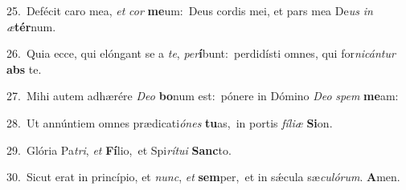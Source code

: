 {\numbfont\textcolor{\numbcolor}{25.}}~Defécit caro mea, \textit{et} \textit{cor} \textbf{me}\-um:~\star Deus cordis mei, et pars mea De\textit{us} \textit{in} \textit{æ}\-\textbf{tér}num.\par
{\numbfont\textcolor{\numbcolor}{26.}}~Quia ecce, qui elóngant se a \textit{te}\-, \textit{per}\-\textbf{í}bunt:~\star perdidísti omnes, qui for\-\textit{ni}\-\textit{cán}\textit{tur} \textbf{abs} te.\par
{\numbfont\textcolor{\numbcolor}{27.}}~Mihi autem adhærére \textit{De}\-\textit{o} \textbf{bo}\-num est:~\star pónere in Dómino \textit{De}\-\textit{o} \textit{spem} \textbf{me}\-am:\par
{\numbfont\textcolor{\numbcolor}{28.}}~Ut annúntiem omnes prædicati\-\textit{ó}\-\textit{nes} \textbf{tu}\-as,~\star in portis \textit{fí}\-\textit{li}\textit{æ} \textbf{Si}\-on.\par
{\numbfont\textcolor{\numbcolor}{29.}}~Glória Pa\-\textit{tri}\-, \textit{et} \textbf{Fí}\-lio,~\star et Spi\-\textit{rí}\-\textit{tu}\textit{i} \textbf{Sanc}\-to.\par
{\numbfont\textcolor{\numbcolor}{30.}}~Sicut erat in princípio, et \textit{nunc}\-, \textit{et} \textbf{sem}\-per,~\star et in sǽcula sæ\-\textit{cu}\-\textit{ló}\textit{rum}. \textbf{A}\-men.\par
